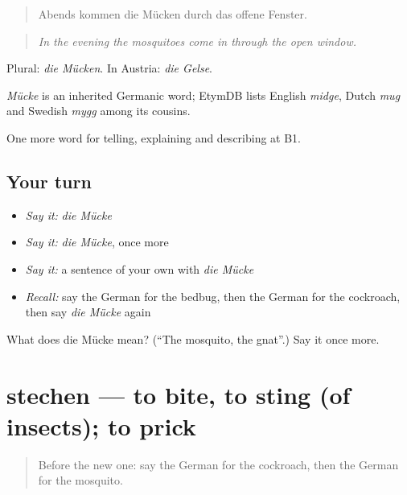 \begin{quote}
Abends kommen die Mücken durch das offene Fenster.
\end{quote}

\begin{quote}
\emph{In the evening the mosquitoes come in through the open window.}
\end{quote}

Plural: \emph{die Mücken}. In Austria: \emph{die Gelse}.

\begin{cousinweb}
\emph{Mücke} is an inherited Germanic word; EtymDB lists English \emph{midge}, Dutch \emph{mug} and Swedish \emph{mygg} among its cousins.
\end{cousinweb}

\begin{grammarlens}[title={What you've built}]
One more word for telling, explaining and describing at B1.
\end{grammarlens}

\subsection*{Your turn}
\begin{itemize}
\raggedright
  \item \emph{Say it:} \emph{die Mücke}
  \item \emph{Say it:} \emph{die Mücke}, once more
  \item \emph{Say it:} a sentence of your own with \emph{die Mücke}
  \item \emph{Recall:} say the German for the bedbug, then the German for the cockroach, then say \emph{die Mücke} again
\end{itemize}

\begin{tcolorbox}[breakable,colback=teal!4,colframe=teal!35!black,title={Before you move on}]
What does die Mücke mean? (\textquotedblleft{}The mosquito, the gnat\textquotedblright{}.) Say it once more.
\end{tcolorbox}
\section[stechen]{stechen — to bite, to sting (of insects); to prick}

\label{lesson:GE-C430-stechen}



\begin{quote}
Before the new one: say the German for the cockroach, then the German for the mosquito.
\end{quote}

